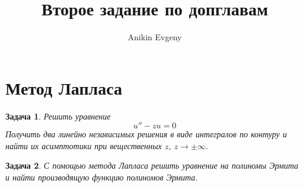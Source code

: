 \documentclass{article}
\title{Второе задание по допглавам}
\author{Anikin Evgeny}
\newtheorem{problem}{Задача}
\begin{document}
\maketitle
\section{Метод Лапласа}
\begin{problem}
    Решить уравнение 
    \begin{equation}
        u'' - zu = 0
    \end{equation}
    Получить два линейно независимых решения в виде интегралов по контуру и найти их 
    асимптотики при вещественных $z$, $z \to \pm \infty$.
\end{problem}
\begin{problem}
    С помощью метода Лапласа решить уравнение на полиномы Эрмита и найти производящую
    функцию полиномов Эрмита.
\end{problem}
    
\end{document}
